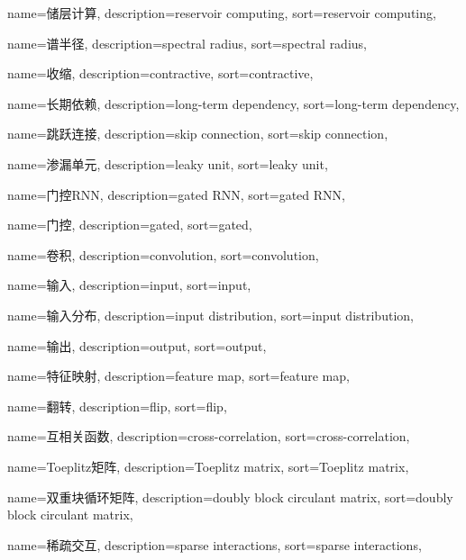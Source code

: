 {
  name=储层计算,
  description={reservoir computing},
  sort={reservoir computing},
}

{
  name=谱半径,
  description={spectral radius},
  sort={spectral radius},
}

{
  name=收缩,
  description={contractive},
  sort={contractive},
}

{
  name=长期依赖,
  description={long-term dependency},
  sort={long-term dependency},
}

{
  name=跳跃连接,
  description={skip connection},
  sort={skip connection},
}

{
  name=渗漏单元,
  description={leaky unit},
  sort={leaky unit},
}

{
  name=门控RNN,
  description={gated RNN},
  sort={gated RNN},
}

{
  name=门控,
  description={gated},
  sort={gated},
}

{
  name=卷积,
  description={convolution},
  sort={convolution},
}

{
  name=输入,
  description={input},
  sort={input},
}

{
  name=输入分布,
  description={input distribution},
  sort={input distribution},
}

{
  name=输出,
  description={output},
  sort={output},
}

{
  name=特征映射,
  description={feature map},
  sort={feature map},
}

{
  name=翻转,
  description={flip},
  sort={flip},
}

{
  name=互相关函数,
  description={cross-correlation},
  sort={cross-correlation},
}

{
  name=Toeplitz矩阵,
  description={Toeplitz matrix},
  sort={Toeplitz matrix},
}

{
  name=双重块循环矩阵,
  description={doubly block circulant matrix},
  sort={doubly block circulant matrix},
}

{
  name=稀疏交互,
  description={sparse interactions},
  sort={sparse interactions},
}

